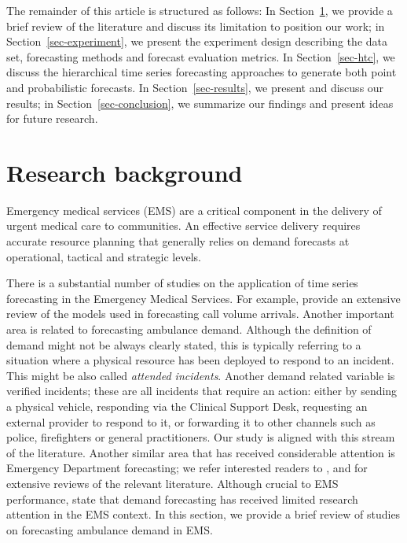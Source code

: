 \documentclass[
  authoryear,
  preprint,
  3p]{elsarticle}
\begin{document}
The remainder of this article is structured as follows: In
Section~\ref{sec-lit}, we provide a brief review of the literature and
discuss its limitation to position our work; in
Section~\ref{sec-experiment}, we present the experiment design
describing the data set, forecasting methods and forecast evaluation
metrics. In Section~\ref{sec-htc}, we discuss the hierarchical time
series forecasting approaches to generate both point and probabilistic
forecasts. In Section~\ref{sec-results}, we present and discuss our
results; in Section~\ref{sec-conclusion}, we summarize our findings and
present ideas for future research.

\hypertarget{sec-lit}{%
\section{Research background}\label{sec-lit}}

Emergency medical services (EMS) are a critical component in the
delivery of urgent medical care to communities. An effective service
delivery requires accurate resource planning that generally relies on
demand forecasts at operational, tactical and strategic levels.

There is a substantial number of studies on the application of time
series forecasting in the Emergency Medical Services. For example,
\citet{ibrahim2016modeling} provide an extensive review of the models
used in forecasting call volume arrivals. Another important area is
related to forecasting ambulance demand. Although the definition of
demand might not be always clearly stated, this is typically referring
to a situation where a physical resource has been deployed to respond to
an incident. This might be also called \emph{attended incidents}.
Another demand related variable is verified incidents; these are all
incidents that require an action: either by sending a physical vehicle,
responding via the Clinical Support Desk, requesting an external
provider to respond to it, or forwarding it to other channels such as
police, firefighters or general practitioners. Our study is aligned with
this stream of the literature. Another similar area that has received
considerable attention is Emergency Department forecasting; we refer
interested readers to \citet{mingliterature2022},
\citet{gul2020exhaustive} and \citet{wargon2009systematic} for extensive
reviews of the relevant literature. Although crucial to EMS performance,
\citet{aringhieri2017emergency} state that demand forecasting has
received limited research attention in the EMS context. In this section,
we provide a brief review of studies on forecasting ambulance demand in
EMS.
\end{document}
